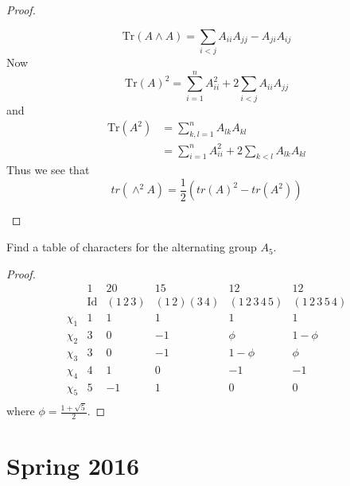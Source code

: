 \documentclass[openany]{book}
\begin{document}
\begin{proof}
\begin{itemize}
        \begin{equation*}
            \text{Tr}(A\wedge A)=\sum_{i<j}A_{ii}A_{jj}-A_{ji}A_{ij}
        \end{equation*}
        Now 
        \begin{equation*}
            \text{Tr}(A)^2=\sum_{i=1}^nA_{ii}^2+2\sum_{i<j}A_{ii}A_{jj}
        \end{equation*}
        and 
        \begin{align*}
            \text{Tr}(A^2)&=\sum_{k,l=1}^nA_{lk}A_{kl}\\
            &=\sum_{i=1}^nA_{ii}^2+2\sum_{k<l}A_{lk}A_{kl}
        \end{align*}
        Thus we see that 
        \[tr(\wedge^{2}A)=\frac{1}{2}(tr(A)^{2}-tr(A^{2}))\]
    \end{itemize}

\end{proof}

\begin{prob}
    Find a table of characters for the alternating group \(A_{5}\).
\end{prob}
\begin{proof}
    \[
\begin{array}{c|ccccc}
 & \text{1} & \text{20} & \text{15} & \text{12} & \text{12} \\ 
 & \text{Id} & (1\,2\,3) & (1\,2)(3\,4) & (1\,2\,3\,4\,5) & (1\,2\,3\,5\,4) \\ 
\hline
\chi_1 & 1 & 1 & 1 & 1 & 1 \\ 
\chi_2 & 3 & 0 & -1 & \phi & 1-\phi \\ 
\chi_3 & 3 & 0 & -1 & 1-\phi & \phi \\ 
\chi_4 & 4 & 1 & 0 & -1 & -1 \\ 
\chi_5 & 5 & -1 & 1 & 0 & 0 \\ 
\end{array}
\]
where $\phi=\frac{1+\sqrt{5}}{2}$.
\end{proof}


\chapter{Spring 2016}
\end{document}
